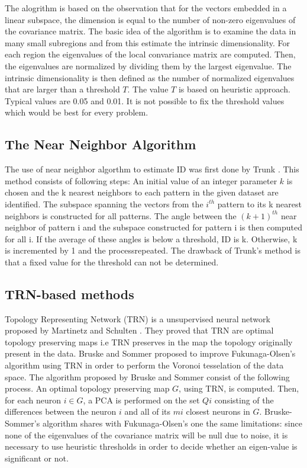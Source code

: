 \documentclass[journal]{IEEEtran}
\begin{document}
The alogrithm is based on the observation that for the vectors embedded in a linear subspace, 
the dimension is equal to the number of non-zero eigenvalues of the covariance matrix. 
The basic idea of the algorithm is to examine the data in many small subregions and from this estimate 
the intrinsic dimensionality. For each region the eigenvalues of the local convariance matrix are computed. 
Then, the eigenvalues are normalized by dividing them by the largest eigenvalue. The intrinsic dimensionality is 
then defined as the number of normalized eigenvalues that are larger than a threshold \(T\). The value \(T\) is 
based on heuristic approach. Typical values are 0.05 and 0.01. It is not possible to fix the threshold values which would be best 
for every problem.


\subsection{The Near Neighbor Algorithm}

The use of near neighbor algorthm to estimate ID was first done by Trunk \cite{Trunk76}. This method consists of following steps: 
An initial value of an integer parameter \(k\) is chosen and the k nearest neighbors to each pattern in the given dataset are identified. 
The subspace spanning the vectors from the \(i^{th}\) pattern to its k nearest neighbors is constructed for all patterns.
The angle between the \((k + 1)^{th}\) near neighbor of pattern i and the subspace constructed
for pattern i is then computed for all i. If the average of these angles is below
a threshold, ID is k. Otherwise, k is incremented by 1 and the processrepeated. 
The drawback of Trunk's method is that a fixed value for the threshold can not be determined.

\subsection{TRN-based methods}

Topology Representing Network (TRN) is a unsupervised neural network proposed by Martinetz and Schulten \cite{Martinetz94}. 
They proved that TRN are optimal topology preserving maps i.e TRN preserves in the map the topology originally present in the data.
Bruske and Sommer \cite{Bruske98} proposed to improve Fukunaga-Olsen’s algorithm using TRN in order to perform the Voronoi tesselation of the data space. 
The algorithm proposed by Bruske and Sommer consist of the following process. An optimal topology preserving map \(G\), using TRN, is computed. 
Then, for each neuron \(i \in G\), a PCA is performed on the set \(Qi\) consisting of the differences between the neuron \(i\) and all of 
its \(mi\) closest neurons in \(G\). Bruske-Sommer’s algorithm shares with Fukunaga-Olsen’s one the same limitations: 
since none of the eigenvalues of the covariance matrix will be null due to noise, it is necessary to use heuristic thresholds 
in order to decide whether an eigen-value is significant or not.
\end{document}
